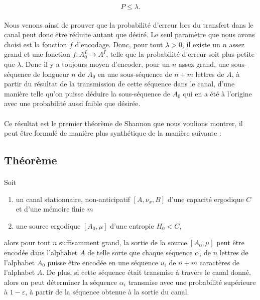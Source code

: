 	\[P\le \lambda.\]
	
	\paragraph{}Nous venons ainsi de prouver que la probabilité d'erreur lors 
	du transfert dans le canal peut donc être réduite autant que désiré.
	Le seul paramètre que nous avons choisi est la fonction $f$ d'encodage.
	Donc, pour tout $\lambda >0$, il existe un $n$ assez grand et
	une fonction $f : A_0^I \to A^I$, telle que la probabilité d'erreur 
	soit plus petite que $\lambda$. Donc il y a toujours moyen d'encoder,
	pour un $n$ assez grand, une sous-séquence de longueur $n$ de $A_0$ 
	en une sous-séquence de $n+m$ lettres de $A$, à partir du résultat 
	de la transmission de cette séquence dans le canal, d'une manière telle
	qu'on puisse déduire la sous-séquence de $A_0$ qui en a été à l'origine 
	avec une probabilité aussi faible que désirée.
	
	\paragraph{}
	Ce résultat est le premier théorème de Shannon que nous voulions montrer,
	il peut être formulé de manière plus synthétique de la manière suivante :
	
\subsection*{Théorème}
	
	\paragraph{}
	Soit 
	\begin{enumerate}
		\item un canal stationnaire, non-anticipatif $[A,\nu_x,B]$ d'une 
			capacité ergodique $C$ et d'une mémoire finie $m$
		\item une source ergodique $[A_0,\mu]$ d'une entropie $H_0<C$,
	\end{enumerate}
	alors pour tout $n$ suffisamment grand, la sortie de la source
	$[A_0,\mu]$ peut être encodée dans l'alphabet $A$ de telle sorte que
	chaque séquence $\alpha_i$ de $n$ lettres de l'alphabet $A_0$ puisse
	être encodée en une séquence $u_i$ de $n+m$ caractères de l'alphabet $A$. 
	De plus, si cette séquence était transmise à travers le canal donné, alors
	on peut déterminer la séquence $\alpha_i$ transmise avec une probabilité 
	supérieure à $1-\varepsilon$, à partir de la séquence obtenue à la sortie 
	du canal.
	
